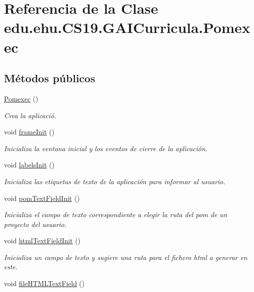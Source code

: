 \hypertarget{a00029}{}\section{Referencia de la Clase edu.\+ehu.\+C\+S19.\+G\+A\+I\+Curricula.\+Pomexec}
\label{a00029}
\subsection*{Métodos públicos}
\begin{DoxyCompactItemize}
\item 
\mbox{\hyperlink{a00029_a8de2bd06d0893d4f24ef2bd8216467cf}{Pomexec}} ()
\begin{DoxyCompactList}\small\item\em Crea la aplicació. \end{DoxyCompactList}\item 
void \mbox{\hyperlink{a00029_a1542762d65badb0de4c9e00d793acd37}{frame\+Init}} ()
\begin{DoxyCompactList}\small\item\em Inicializa la ventana inicial y los eventos de cierre de la aplicación. \end{DoxyCompactList}\item 
void \mbox{\hyperlink{a00029_ab5c03aee261eda106376a3111cadaa0a}{labels\+Init}} ()
\begin{DoxyCompactList}\small\item\em Inicializa las etiquetas de texto de la aplicación para informar al usuario. \end{DoxyCompactList}\item 
void \mbox{\hyperlink{a00029_a99d8b8d9e55a300b5ce6f7cc7d546a26}{pom\+Text\+Field\+Init}} ()
\begin{DoxyCompactList}\small\item\em Inicializa el campo de texto correspondiente a elegir la ruta del pom de un proyecto del usuario. \end{DoxyCompactList}\item 
void \mbox{\hyperlink{a00029_aac5d95af4efdb3dc20e305283cedef95}{html\+Text\+Field\+Init}} ()
\begin{DoxyCompactList}\small\item\em Inicializa un campo de texto y sugiere una ruta para el fichero html a generar en este. \end{DoxyCompactList}\item 
void \mbox{\hyperlink{a00029_aea79b02cfc8fae015e78943e32710210}{file\+H\+T\+M\+L\+Text\+Field}} ()

\end{DoxyCompactItemize}
